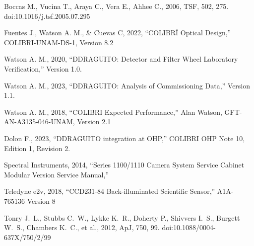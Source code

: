 \clearpage
\begin{thebibliography}{Te2v}

 Boccas M., Vucina T., Araya C., Vera E., Ahhee C., 2006, TSF, 502, 275. doi:10.1016/j.tsf.2005.07.295

Fuentes J., Watson A. M., \& Cuevas C, 2022, “COLIBRÍ Optical Design,” COLIBRI-UNAM-DS-1, Version 8.2

Watson A. M., 2020, “DDRAGUITO: Detector and Filter Wheel Laboratory Verification,” Version 1.0.

Watson A. M., 2023, “DDRAGUITO: Analysis of Commissioning Data,” Version 1.1.

Watson A. M., 2018, “COLIBRI Expected Performance,” Alan Watson, GFT-AN-A3135-046-UNAM, Version 2.1

Dolon F., 2023, “DDRAGUITO integration at OHP,” COLIBRI OHP Note 10, Edition 1, Revision 2.

Spectral Instruments, 2014, “Series 1100/1110 Camera System Service Cabinet Modular Version Service Manual,”

Teledyne e2v, 2018, “CCD231-84 Back-illuminated Scientific Sensor,” A1A-765136 Version 8

 Tonry J.~L., Stubbs C.~W., Lykke K.~R., Doherty P., Shivvers I.~S., Burgett W.~S., Chambers K.~C., et al., 2012, ApJ, 750, 99. doi:10.1088/0004-637X/750/2/99


\end{thebibliography}